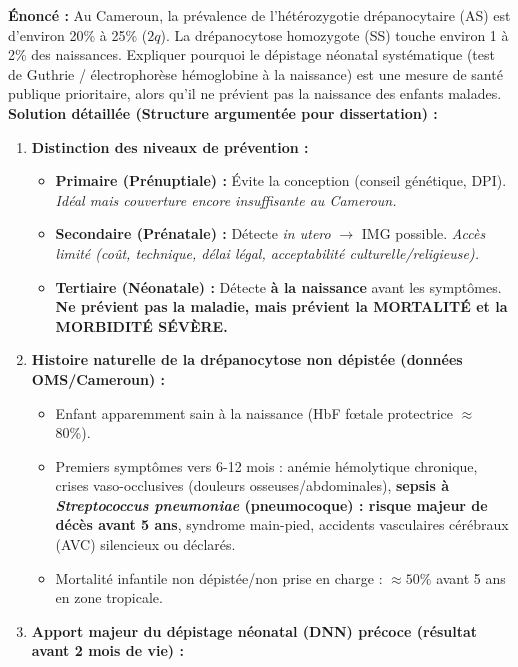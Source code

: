 \documentclass[11pt]{article}
\begin{document}
\begin{exoresolu}
    \textbf{Énoncé :} Au Cameroun, la prévalence de l'hétérozygotie drépanocytaire (AS) est d'environ 20\% à 25\% ($2q$). La drépanocytose homozygote (SS) touche environ 1 à 2\% des naissances. Expliquer pourquoi le dépistage néonatal systématique (test de Guthrie / électrophorèse hémoglobine à la naissance) est une mesure de santé publique prioritaire, alors qu'il ne prévient pas la naissance des enfants malades.
    \tcblower
    \textbf{Solution détaillée (Structure argumentée pour dissertation) :}
    \begin{enumerate}
        \item \textbf{Distinction des niveaux de prévention :}
              \begin{itemize}
                  \item \textbf{Primaire (Prénuptiale) :} Évite la conception (conseil génétique, DPI). \textit{Idéal mais couverture encore insuffisante au Cameroun.}
                  \item \textbf{Secondaire (Prénatale) :} Détecte \emph{in utero} $\rightarrow$ IMG possible. \textit{Accès limité (coût, technique, délai légal, acceptabilité culturelle/religieuse).}
                  \item \textbf{Tertiaire (Néonatale) :} Détecte \textbf{à la naissance} avant les symptômes. \textbf{Ne prévient pas la maladie, mais prévient la MORTALITÉ et la MORBIDITÉ SÉVÈRE.}
              \end{itemize}
        \item \textbf{Histoire naturelle de la drépanocytose non dépistée (données OMS/Cameroun) :}
              \begin{itemize}
                  \item Enfant apparemment sain à la naissance (HbF fœtale protectrice $\approx$ 80\%).
                  \item Premiers symptômes vers 6-12 mois : anémie hémolytique chronique, crises vaso-occlusives (douleurs osseuses/abdominales), \textbf{sepsis à \emph{Streptococcus pneumoniae} (pneumocoque) : risque majeur de décès avant 5 ans}, syndrome main-pied, accidents vasculaires cérébraux (AVC) silencieux ou déclarés.
                  \item Mortalité infantile non dépistée/non prise en charge : $\approx 50\%$ avant 5 ans en zone tropicale.
              \end{itemize}
        \item \textbf{Apport majeur du dépistage néonatal (DNN) précoce (résultat avant 2 mois de vie) :}

\end{enumerate}
\end{exoresolu}
\end{document}
